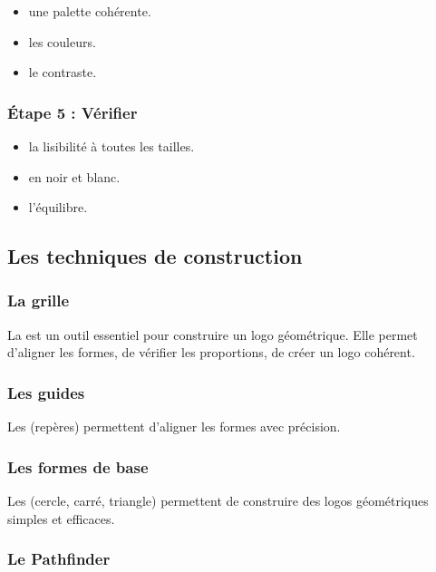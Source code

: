 \begin{itemize}
    \item {} une palette cohérente.
    \item {} les couleurs.
    \item {} le contraste.
\end{itemize}

\subsubsection{Étape 5 : Vérifier}

\begin{itemize}
    \item {} la lisibilité à toutes les tailles.
    \item {} en noir et blanc.
    \item {} l'équilibre.
\end{itemize}

\subsection{Les techniques de construction}

\subsubsection{La grille}

La  est un outil essentiel pour construire un logo géométrique. Elle permet d'aligner les formes, de vérifier les proportions, de créer un logo cohérent.

\subsubsection{Les guides}

Les  (repères) permettent d'aligner les formes avec précision.

\subsubsection{Les formes de base}

Les  (cercle, carré, triangle) permettent de construire des logos géométriques simples et efficaces.

\subsubsection{Le Pathfinder}

